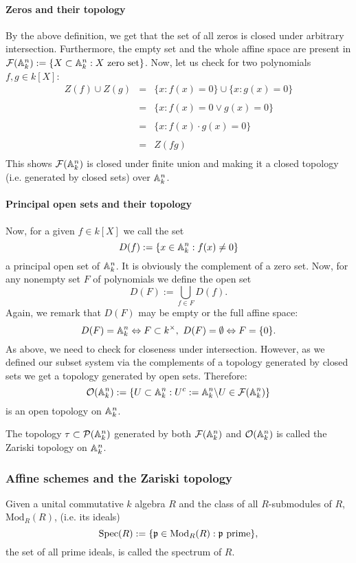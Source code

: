 \paragraph{Zeros and their topology}
By the above definition, we get that the set of all zeros is closed under arbitrary intersection. Furthermore, the empty set and the whole affine space are present in $\mathcal{F}({\mathbb{A}^n_{k}}) := \{X \subset \mathbb{A}^n_{k} : X \ \mathrm{zero~set}\}$. Now, let us check for two polynomials $f, g \in k[X]$:
$$\begin{array}{rcl}
Z(f) \cup Z(g) &=& \{x : f(x) = 0\} \cup \{x : g(x) = 0\}\\&&\\
&=& \{x : f(x) = 0 \vee g(x) = 0\}\\&&\\
&=& \{x : f(x) \cdot g(x) = 0\}\\&&\\
&=& Z(f g)\\
\end{array}$$
This shows $\mathcal{F}({\mathbb{A}^n_{k}})$ is closed under finite union and making it a closed topology (i.e. generated by closed sets) over $\mathbb{A}^n_{k}$.\\
\paragraph{Principal open sets and their topology}
\indent Now, for a given $f \in k[X]$ we call the set
$$D(f) := \{x \in \mathbb{A}^n_{k} : f(x) \neq 0\}$$
a principal open set of $\mathbb{A}^n_{k}$. It is obviously the complement of a zero set. Now, for any nonempty set $F$ of polynomials we define the open set
$$D(F) := \bigcup_{f \in F} D(f).$$
Again, we remark that $D(F)$ may be empty or the full affine space:
$$D(F) = \mathbb{A}^n_{k} \Leftrightarrow F \subset k^\times,\ D(F) = \emptyset \Leftrightarrow F = \{0\}.$$
As above, we need to check for closeness under intersection. However, as we defined our subset system via the complements of a topology generated by closed sets we get a topology generated by open sets. Therefore:
$$\mathcal{O}({\mathbb{A}^n_{k}}) := \left\{U \subset \mathbb{A}^n_{k} : U^c := \mathbb{A}^n_{k}\backslash U \in \mathcal{F}({\mathbb{A}^n_{k}})\right\}$$
is an open topology on $\mathbb{A}^n_{k}$.
\begin{defi}
The topology $\tau \subset \mathcal{P}(\mathbb{A}^n_{k})$ generated by both $\mathcal{F}({\mathbb{A}^n_{k}})$ and $\mathcal{O}({\mathbb{A}^n_{k}})$ is called the Zariski topology on $\mathbb{A}^n_{k}$.
\end{defi}
\subsubsection{Affine schemes and the Zariski topology}
Given a unital commutative $k$ algebra $R$ and the class of all $R$-submodules of $R$, $\mathrm{Mod}_R(R)$, (i.e. its ideals)
$$\mathrm{Spec}(R) := \{\mathfrak{p} \in \mathrm{Mod}_R(R) : \mathfrak{p} \ \mathrm{prime}\},$$
the set of all prime ideals, is called the spectrum of $R$.
